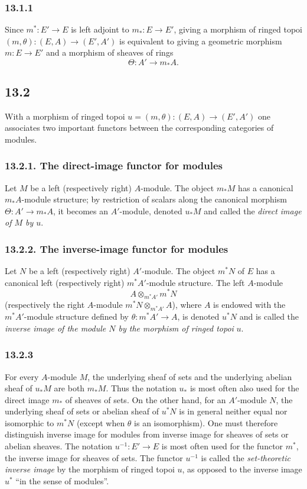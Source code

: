 \documentclass[11pt]{article}
\begin{document}
\subsubsection*{13.1.1}
Since $m^*:E'\to E$ is left adjoint to $m_*:E\to E'$, giving a morphism of ringed topoi $(m,\theta):(E,A)\to(E',A')$ is equivalent to giving a geometric morphism $m:E\to E'$ and a morphism of sheaves of rings
\[
\Theta:A'\longrightarrow m_*A.
\]

\subsection*{13.2}
With a morphism of ringed topoi $u=(m,\theta):(E,A)\to(E',A')$ one associates two important functors between the corresponding categories of modules.

\subsubsection*{13.2.1. The direct-image functor for modules}
Let $M$ be a left (respectively right) $A$-module. The object $m_*M$ has a canonical $m_*A$-module structure; by restriction of scalars along the canonical morphism $\Theta:A'\to m_*A$, it becomes an $A'$-module, denoted $u_*M$ and called the \emph{direct image of $M$ by $u$}.

\subsubsection*{13.2.2. The inverse-image functor for modules}
Let $N$ be a left (respectively right) $A'$-module. The object $m^*N$ of $E$ has a canonical left (respectively right) $m^*A'$-module structure. The left $A$-module
\[
A\otimes_{m^*A'}m^*N
\]
(respectively the right $A$-module $m^*N\otimes_{m^*A'}A$), where $A$ is endowed with the $m^*A'$-module structure defined by $\theta:m^*A'\to A$, is denoted $u^*N$ and is called the \emph{inverse image of the module $N$ by the morphism of ringed topoi} $u$.

\subsubsection*{13.2.3}
For every $A$-module $M$, the underlying sheaf of sets and the underlying abelian sheaf of $u_*M$ are both $m_*M$. Thus the notation $u_*$ is most often also used for the direct image $m_*$ of sheaves of sets. On the other hand, for an $A'$-module $N$, the underlying sheaf of sets or abelian sheaf of $u^*N$ is in general neither equal nor isomorphic to $m^*N$ (except when $\theta$ is an isomorphism). One must therefore distinguish inverse image for modules from inverse image for sheaves of sets or abelian sheaves. The notation $u^{-1}:E'\to E$ is most often used for the functor $m^*$, the inverse image for sheaves of sets. The functor $u^{-1}$ is called the \emph{set-theoretic inverse image} by the morphism of ringed topoi $u$, as opposed to the inverse image $u^*$ ``in the sense of modules''.
\end{document}
